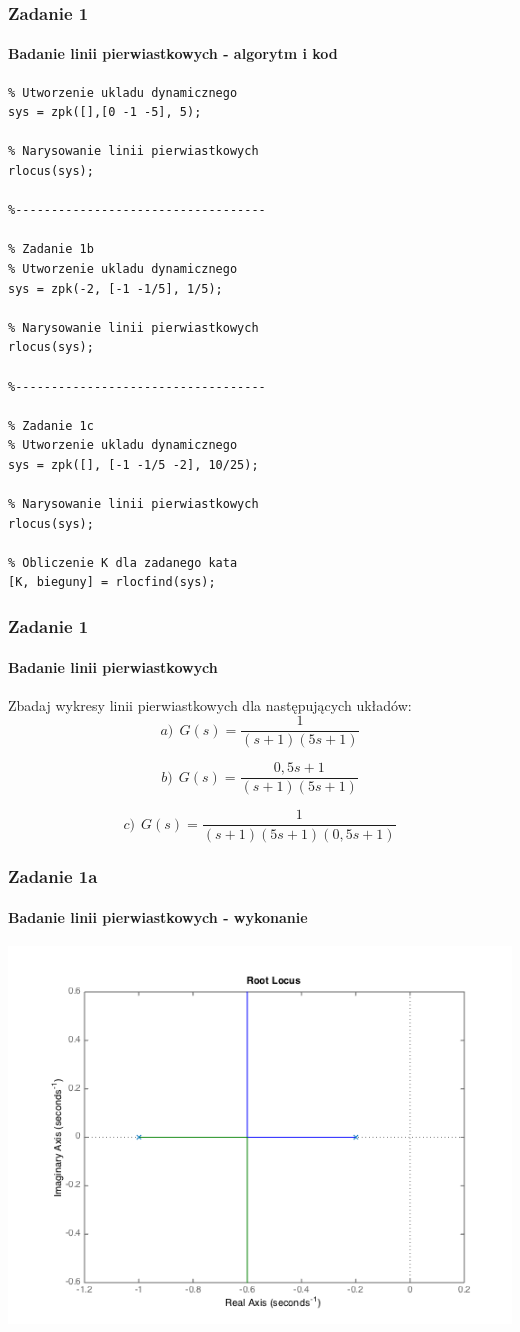 \documentclass{beamer}
\begin{document}
\begin{frame}[fragile]\frametitle{Zadanie 1}\framesubtitle{Badanie linii pierwiastkowych - algorytm i kod}

\begin{lstlisting}[centering]
% Zadanie 1a
% Utworzenie ukladu dynamicznego
sys = zpk([],[0 -1 -5], 5);

% Narysowanie linii pierwiastkowych
rlocus(sys);

%-----------------------------------

% Zadanie 1b
% Utworzenie ukladu dynamicznego
sys = zpk(-2, [-1 -1/5], 1/5);

% Narysowanie linii pierwiastkowych
rlocus(sys);

%-----------------------------------

% Zadanie 1c
% Utworzenie ukladu dynamicznego
sys = zpk([], [-1 -1/5 -2], 10/25);

% Narysowanie linii pierwiastkowych
rlocus(sys);

% Obliczenie K dla zadanego kata
[K, bieguny] = rlocfind(sys);

\end{lstlisting}

\end{frame}

\begin{frame}\frametitle{Zadanie 1}\framesubtitle{Badanie linii pierwiastkowych}
	Zbadaj wykresy linii pierwiastkowych dla następujących układów:
	\[
	a) ~~ G(s) = \frac{1}{(s+1)(5s+1)}
	\]
	
	\[
	b) ~~ G(s) = \frac{0,5s + 1}{(s+1)(5s+1)}
	\]
	
	\[
	c) ~~ G(s) = \frac{1}{(s+1)(5s+1)(0,5s + 1)}
	\]
\end{frame}

\begin{frame}\frametitle{Zadanie 1a}\framesubtitle{Badanie linii pierwiastkowych - wykonanie}

\centering	\includegraphics[scale=0.45]{zadanie1_a.png}

\end{frame}
\end{document}
